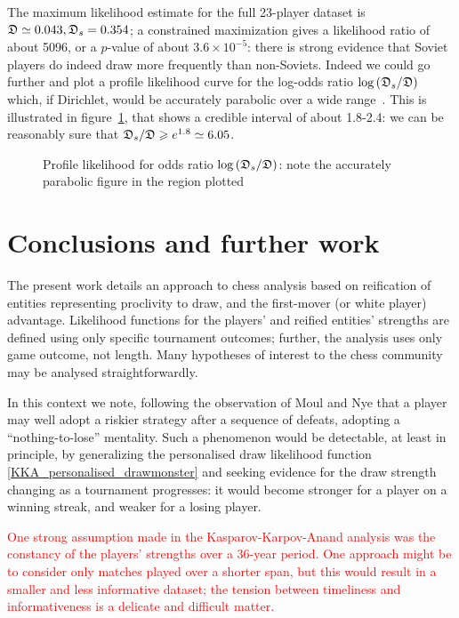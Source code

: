 \documentclass[review]{elsarticle}
\begin{document}
The maximum likelihood estimate for the full 23-player dataset is
$\mathfrak{D}\simeq 0.043, \mathfrak{D}_s=0.354$; a constrained maximization gives a
likelihood ratio of about 5096, or a $p$-value of about $3.6\times
10^{-5}$: there is strong evidence that Soviet players do indeed draw
more frequently than non-Soviets.  Indeed we could go further and plot
a profile likelihood curve for the log-odds ratio
$\log\left(\mathfrak{D}_s/\mathfrak{D}\right)$ which, if Dirichlet, would be
accurately parabolic over a wide range~\cite[page 343]{ohagan2004}.
This is illustrated in figure~\ref{proflike}, that shows a credible
interval of about 1.8-2.4: we can be reasonably sure that
$\mathfrak{D}_s/\mathfrak{D}\geqslant e^{1.8}\simeq 6.05$.


\begin{figure}[htbp]
\begin{center}
\caption{Profile likelihood \label{proflike} for odds ratio
  $\log\left(\mathfrak{D}_s/\mathfrak{D}\right)$: note the accurately parabolic figure in
  the region plotted}
  \end{center}
\end{figure}

\section{Conclusions and further work}

The present work details an approach to chess analysis based on
reification of entities representing proclivity to draw, and the
first-mover (or white player) advantage.  Likelihood functions for the
players' and reified entities' strengths are defined using only
specific tournament outcomes; further, the analysis uses only game
outcome, not length.  Many hypotheses of interest to the chess
community may be analysed straightforwardly.

In this context we note, following the observation of Moul and Nye
that a player may well adopt a riskier strategy after a sequence of
defeats, adopting a ``nothing-to-lose'' mentality.  Such a phenomenon
would be detectable, at least in principle, by generalizing the
personalised draw likelihood function
\ref{KKA_personalised_drawmonster} and seeking evidence for the draw
strength changing as a tournament progresses: it would become stronger
for a player on a winning streak, and weaker for a losing player.

\textcolor{red}{One strong assumption made in the
  Kasparov-Karpov-Anand analysis was the constancy of the players'
  strengths over a 36-year period.  One approach might be to consider
  only matches played over a shorter span, but this would result in a
  smaller and less informative dataset; the tension between timeliness
  and informativeness is a delicate and difficult matter.}
\end{document}
